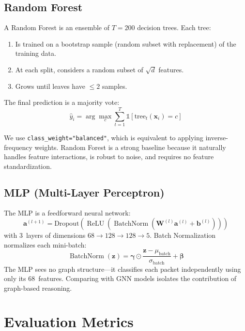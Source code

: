 \documentclass[conference]{IEEEtran}
\newcommand{\vect}[1]{\bm{#1}}
\newcommand{\mat}[1]{\mathbf{#1}}
\DeclareMathOperator{\ReLU}{ReLU}
\DeclareMathOperator{\BN}{BatchNorm}
\begin{document}
\subsection{Random Forest}

A Random Forest is an ensemble of $T = 200$ decision trees. Each tree:
\begin{enumerate}
    \item Is trained on a bootstrap sample (random subset with replacement) of the training data.
    \item At each split, considers a random subset of $\sqrt{d}$ features.
    \item Grows until leaves have $\leq 2$ samples.
\end{enumerate}

The final prediction is a majority vote:
\begin{equation}
    \hat{y}_i = \arg\max_c \sum_{t=1}^{T} \mathbb{1}[\text{tree}_t(\vect{x}_i) = c]
\end{equation}

We use \texttt{class\_weight="balanced"}, which is equivalent to applying inverse-frequency weights. Random Forest is a strong baseline because it naturally handles feature interactions, is robust to noise, and requires no feature standardization.

\subsection{MLP (Multi-Layer Perceptron)}

The MLP is a feedforward neural network:
\begin{equation}
    \vect{a}^{(l+1)} = \text{Dropout}\!\left(\ReLU\!\left(\BN\!\left(\mat{W}^{(l)} \vect{a}^{(l)} + \vect{b}^{(l)}\right)\right)\right)
\end{equation}
with 3~layers of dimensions $68 \to 128 \to 128 \to 5$. Batch Normalization normalizes each mini-batch:
\begin{equation}
    \BN(\vect{z}) = \bm{\gamma} \odot \frac{\vect{z} - \mu_{\text{batch}}}{\sigma_{\text{batch}}} + \bm{\beta}
\end{equation}
The MLP sees no graph structure---it classifies each packet independently using only its 68~features. Comparing with GNN models isolates the contribution of graph-based reasoning.

\section{Evaluation Metrics}
\label{sec:metrics}
\end{document}
